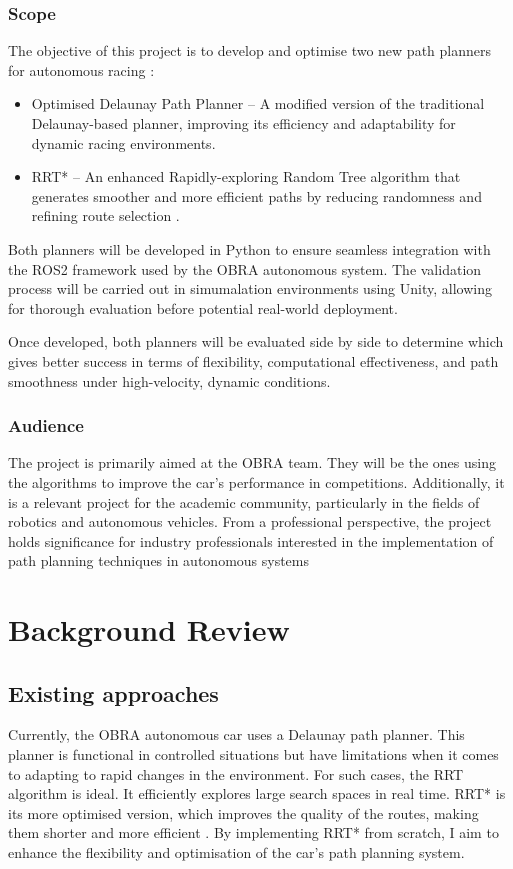 \documentclass[a4paper,11pt]{report}
\begin{document}
\subsection{Scope}
The objective of this project is to develop and optimise two new path planners for autonomous racing \cite{reference4}:
\begin{itemize}
    \item Optimised Delaunay Path Planner – A modified version of the traditional 
    Delaunay-based planner, improving its efficiency and adaptability for dynamic racing environments.
    \item RRT* – An enhanced Rapidly-exploring Random Tree algorithm that generates 
    smoother and more efficient paths by reducing randomness and refining route selection \cite{reference3}.
\end{itemize}
Both planners will be developed in Python to ensure seamless integration with the ROS2 framework 
used by the OBRA autonomous system. The validation process will be carried out in simumalation environments using Unity, 
allowing for thorough evaluation before potential real-world deployment.

Once developed, both planners will be evaluated side by side to determine which gives 
better success in terms of flexibility, computational effectiveness, and path smoothness under high-velocity, dynamic conditions.

\subsection{Audience}
The project is primarily aimed at the OBRA team. They will be the ones using the 
algorithms to improve the car's performance in competitions. Additionally, it is a 
relevant project for the academic community, particularly in the fields of robotics and 
autonomous vehicles. From a professional perspective, the project holds significance 
for industry professionals interested in the implementation of path planning techniques 
in autonomous systems

\newpage
\chapter{Background Review}
\section{Existing approaches}
Currently, the OBRA autonomous car uses a Delaunay path planner. This planner is functional in 
controlled situations but have limitations when it comes to adapting to rapid changes 
in the environment.   
For such cases, the RRT algorithm is ideal. It efficiently explores large search spaces 
in real time. RRT* is its more optimised version, which improves the quality of the routes, 
making them shorter and more efficient \cite{reference5}. By implementing RRT* from scratch, I aim to 
enhance the flexibility and optimisation of the car's path planning system.
\end{document}
